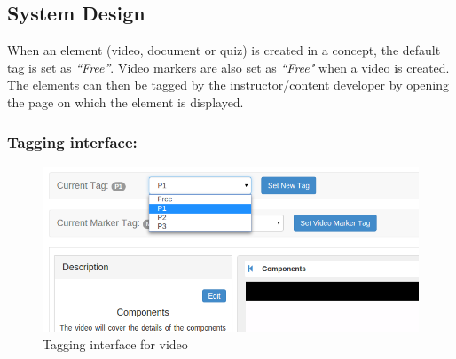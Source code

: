 \subsection{System Design}

When an element (video, document or quiz) is created in a concept, the default tag is set as \textit{``Free''}. Video markers are also set as \textit{``Free"} when a video is created. The elements can then be tagged by the instructor/content developer by opening the page on which the element is displayed.

\subsubsection*{Tagging interface:}

\begin{figure}[h]
\centering
\includegraphics[width=1\linewidth]{./media/tagging_interface}
\caption{Tagging interface for video}
\label{fig:tagging_interface}
\end{figure}

